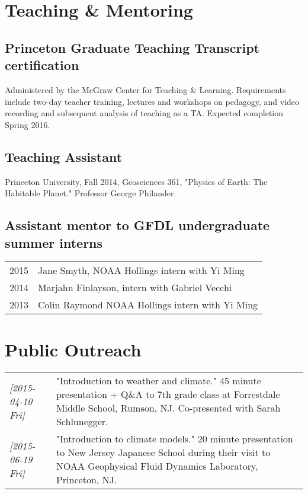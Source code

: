 \documentclass{article}
\begin{document}
\section*{Teaching \& Mentoring}
\label{sec:orgheadline14}
\subsection*{Princeton Graduate Teaching Transcript certification}
\label{sec:orgheadline11}
Administered by the McGraw Center for Teaching \& Learning.  Requirements include
two-day teacher training, lectures and workshops on pedagogy, and video recording
and subsequent analysis of teaching as a TA.  Expected completion Spring 2016.
\subsection*{Teaching Assistant}
\label{sec:orgheadline12}
Princeton University, Fall 2014, Geosciences 361, "Physics of Earth: The
Habitable Planet."  Professor George Philander.
\subsection*{Assistant mentor to GFDL undergraduate summer interns}
\label{sec:orgheadline13}
\begin{center}
\begin{tabularx}{\textwidth}{lX}
2015 & Jane Smyth, NOAA Hollings intern with Yi Ming\\
2014 & Marjahn Finlayson, intern with Gabriel Vecchi\\
2013 & Colin Raymond NOAA Hollings intern with Yi Ming\\
\end{tabularx}
\end{center}
\section*{Public Outreach}
\label{sec:orgheadline15}
\begin{center}
\begin{tabularx}{\textwidth}{lX}
\textit{[2015-04-10 Fri]} & "Introduction to weather and climate."  45 minute presentation + Q\&A to 7th grade class at Forrestdale Middle School, Rumson, NJ.  Co-presented with Sarah Schlunegger.\\
\textit{[2015-06-19 Fri]} & "Introduction to climate models."  20 minute presentation to New Jersey Japanese School during their visit to NOAA Geophysical Fluid Dynamics Laboratory, Princeton, NJ.\\
\end{tabularx}
\end{center}
\end{document}
